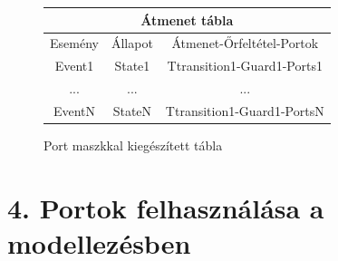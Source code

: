 \documentclass[a4paper,12pt]{report}
\begin{document}
\begin{enumerate}
\begin{figure}[H]
\begin{center}
\begin{tabular}{@{}cc|c@{}} \toprule
\multicolumn{3}{c}{Átmenet tábla} \\\midrule
Esemény & Állapot 	&  Átmenet-Őrfeltétel-Portok\\\midrule
Event1 	& State1 	&  Ttransition1-Guard1-Ports1 \\
... 	& ... 	 	& ... \\
EventN 	& StateN 	& Ttransition1-Guard1-PortsN
\end{tabular}
\small
\caption{Port maszkkal kiegészített tábla}
\end{center}
\end{figure}

\end{enumerate}

\chapter*{4. Portok felhasználása a modellezésben}
\end{document}
